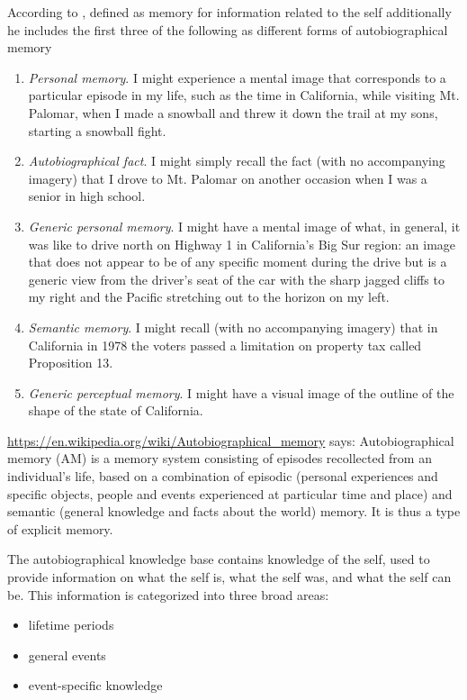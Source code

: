 \documentclass{book}
\begin{document}
According to \cite{brewer-1986-what-is-autobiographical-memory}, defined as memory for information related to the self additionally he includes the first three of the following as different forms of autobiographical memory
    \begin{enumerate}
        \item \textit{Personal memory}. I might experience a mental image that corresponds to a particular episode in my life, such as the time in California, while visiting Mt. Palomar, when I made a snowball and threw it down the trail at my sons, starting a snowball fight.
        \item \textit{Autobiographical fact}. I might simply recall the fact (with no accompanying imagery) that I drove to Mt. Palomar on another occasion when I was a senior in high school.
        \item \textit{Generic personal memory}. I might have a mental image of what, in general, it was like to drive north on Highway 1 in California’s Big Sur region: an image that does not appear to be of any specific moment during the drive but is a generic view from the driver’s seat of the car with the sharp jagged cliffs to my right and the Pacific stretching out to the horizon on my left.
        \item \textit{Semantic memory}. I might recall (with no accompanying imagery) that in California in 1978 the voters passed a limitation on property tax called Proposition 13.
        \item \textit{Generic perceptual memory}. I might have a visual image of the outline of the shape of the state of California.
    \end{enumerate}
    
    
    
    
    \url{https://en.wikipedia.org/wiki/Autobiographical_memory} says:
    Autobiographical memory (AM) is a memory system consisting of episodes recollected from an individual's life, based on a combination of episodic (personal experiences and specific objects, people and events experienced at particular time and place) and semantic (general knowledge and facts about the world) memory. It is thus a type of explicit memory.
    
    The autobiographical knowledge base contains knowledge of the self, used to provide information on what the self is, what the self was, and what the self can be. This information is categorized into three broad areas:
    \begin{itemize}
        \item lifetime periods
        \item general events
        \item event-specific knowledge
    \end{itemize}
    
\end{document}
